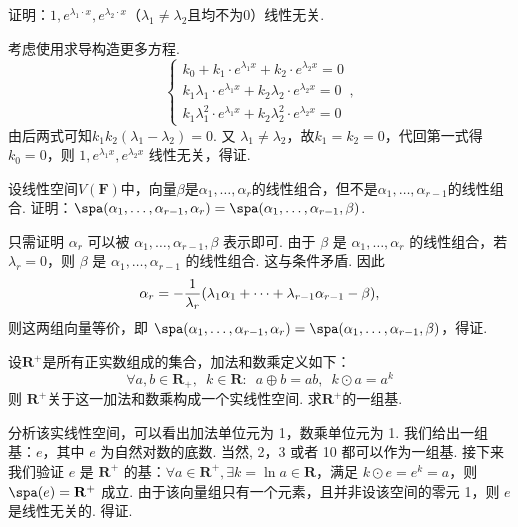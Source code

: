 \begin{exercise}
\begin{exgroup}
        \item 证明：$1,e^{\lambda_1\cdot x},e^{\lambda_2\cdot x}$（$\lambda_1\neq\lambda_2$且均不为0）线性无关.
        \begin{answer}
            考虑使用求导构造更多方程.
            \[\begin{cases}
                    k_0+k_1\cdot e^{\lambda_1 x}+k_2\cdot e^{\lambda_2 x}=0               \\
                    k_1\lambda_1\cdot e^{\lambda_1 x}+k_2\lambda_2\cdot e^{\lambda_2 x}=0 \\
                    k_1\lambda_1^2\cdot e^{\lambda_1 x}+k_2\lambda_2^2\cdot e^{\lambda_2 x}=0
                \end{cases},\]
          由后两式可知$k_1k_2(\lambda_1-\lambda_2)=0$. 又 $\lambda_1\neq\lambda_2$，故$k_1=k_2=0$，代回第一式得 $k_0=0$，则 $1,e^{\lambda_1x},e^{\lambda_2x}$ 线性无关，得证.
        \end{answer}

        \item 设线性空间$V(\mathbf{F})$中，向量$\beta$是$\alpha_1,\ldots,\alpha_r$的线性组合，但不是$\alpha_1,\ldots,\alpha_{r-1}$的线性组合. 证明：$\spa(\alpha_1,\ldots,\alpha_{r-1},\alpha_r)=\spa(\alpha_1,\ldots,\alpha_{r-1},\beta)$.
        \begin{answer}
            只需证明 $\alpha_r$ 可以被 $\alpha_1,\ldots,\alpha_{r-1},\beta$ 表示即可. 由于 $\beta$ 是 $\alpha_1,\ldots,\alpha_r$ 的线性组合，若 $\lambda_r=0$，则 $\beta$ 是 $\alpha_1,\ldots,\alpha_{r-1}$ 的线性组合. 这与条件矛盾. 因此 \[\alpha_r=-\vspace{1ex}\dfrac 1{\lambda_r}(\lambda_1\alpha_1+\cdots+\lambda_{r-1}\alpha_{r-1}-\beta),\] 则这两组向量等价，即 $\spa(\alpha_1,\ldots,\alpha_{r-1},\alpha_r)=\spa(\alpha_1,\ldots,\alpha_{r-1},\beta)$，得证.
        \end{answer}

        \item \label{item:3:正实数线性空间}
        设$\mathbf{R}^+$是所有正实数组成的集合，加法和数乘定义如下：
        \[ \forall a,b \in \mathbf{R}_+,\enspace k\in \mathbf{R}\colon\enspace a\oplus b = ab,\enspace k\odot a = a^k \]
        则 $\mathbf{R}^+$关于这一加法和数乘构成一个实线性空间. 求$\mathbf{R}^+$的一组基.
        \begin{answer}
            分析该实线性空间，可以看出加法单位元为 1，数乘单位元为 1. 我们给出一组基：$e$，其中 $e$ 为自然对数的底数. 当然, 2，3 或者 10 都可以作为一组基. 接下来我们验证 $e$ 是 $\mathbf{R}^+$ 的基：$\forall a\in \mathbf{R}^+,\exists k=\ln a\in\mathbf{R}$，满足 $k\odot e=e^k=a$，则 $\spa(e)=\mathbf{R}^+$ 成立. 由于该向量组只有一个元素，且并非设该空间的零元 1，则 $e$ 是线性无关的. 得证.
        \end{answer}
    \end{exgroup}


\end{exercise}
